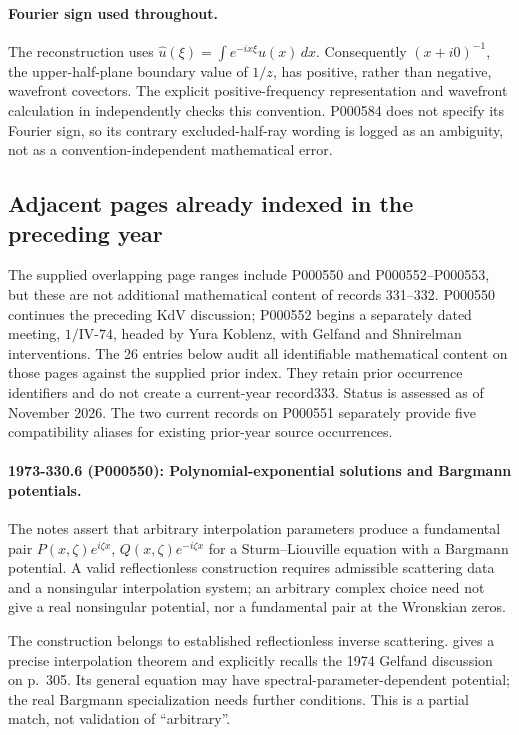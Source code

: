 \paragraph{Fourier sign used throughout.}
The reconstruction uses
\(\widehat u(\xi)=\int e^{-ix\xi}u(x)\,dx\).
Consequently \((x+i0)^{-1}\), the upper-half-plane boundary value of
\(1/z\), has positive, rather than negative, wavefront covectors.
The explicit positive-frequency representation and wavefront
calculation in
\citet[Appendix A, equation (A.4)]{bohrlefeuvrepaternain2024invariant}
independently checks this convention. P000584 does not specify its
Fourier sign, so its contrary excluded-half-ray wording is logged as
an ambiguity, not as a convention-independent mathematical error.


\subsection{Adjacent pages already indexed in the preceding year}

The supplied overlapping page ranges include P000550 and P000552--P000553, but these are not additional mathematical content of records 331--332. P000550 continues the preceding KdV discussion; P000552 begins a separately dated meeting, \(1/\mathrm{IV}\text{-}74\), headed by Yura Koblenz, with Gelfand and Shnirelman interventions. The 26 entries below audit all identifiable mathematical content on those pages against the supplied prior index. They retain prior occurrence identifiers and do not create a current-year record333. Status is assessed as of November 2026. The two current records on P000551 separately provide five compatibility aliases for existing prior-year source occurrences.

\paragraph{1973-330.6 (P000550): Polynomial-exponential solutions and Bargmann potentials.}
The notes assert that arbitrary interpolation parameters produce a fundamental pair \(P(x,\zeta)e^{i\zeta x}\), \(Q(x,\zeta)e^{-i\zeta x}\) for a Sturm--Liouville equation with a Bargmann potential. A valid reflectionless construction requires admissible scattering data and a nonsingular interpolation system; an arbitrary complex choice need not give a real nonsingular potential, nor a fundamental pair at the Wronskian zeros.

The construction belongs to established reflectionless inverse scattering. \citet[\S3, Theorem~1]{shabat2014interpolation} gives a precise interpolation theorem and explicitly recalls the 1974 Gelfand discussion on p.~305. Its general equation may have spectral-parameter-dependent potential; the real Bargmann specialization needs further conditions. This is a partial match, not validation of “arbitrary”.

